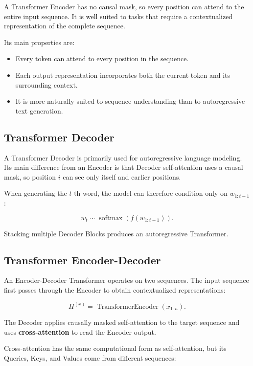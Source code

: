 \documentclass[
  a4paper,
  10pt]{article}
\providecommand{\tightlist}{%
  \setlength{\itemsep}{0pt}\setlength{\parskip}{0pt}}
\begin{document}
A Transformer Encoder has no causal mask, so every position can attend
to the entire input sequence. It is well suited to tasks that require a
contextualized representation of the complete sequence.

Its main properties are:

\begin{itemize}
\tightlist
\item
  Every token can attend to every position in the sequence.
\item
  Each output representation incorporates both the current token and its
  surrounding context.
\item
  It is more naturally suited to sequence understanding than to
  autoregressive text generation.
\end{itemize}

\subsection{Transformer Decoder}\label{transformer-decoder}

A Transformer Decoder is primarily used for autoregressive language
modeling. Its main difference from an Encoder is that Decoder
self-attention uses a causal mask, so position \(i\) can see only itself
and earlier positions.

When generating the \(t\)-th word, the model can therefore condition
only on \(w_{1:t-1}\):

\[
w_t\sim\operatorname{softmax}\left(f(w_{1:t-1})\right).
\]

Stacking multiple Decoder Blocks produces an autoregressive Transformer.

\subsection{Transformer
Encoder-Decoder}\label{transformer-encoder-decoder}

An Encoder-Decoder Transformer operates on two sequences. The input
sequence first passes through the Encoder to obtain contextualized
representations:

\[
H^{(x)}
=\operatorname{TransformerEncoder}(x_{1:n}).
\]

The Decoder applies causally masked self-attention to the target
sequence and uses \textbf{cross-attention} to read the Encoder output.

Cross-attention has the same computational form as self-attention, but
its Queries, Keys, and Values come from different sequences:
\end{document}
